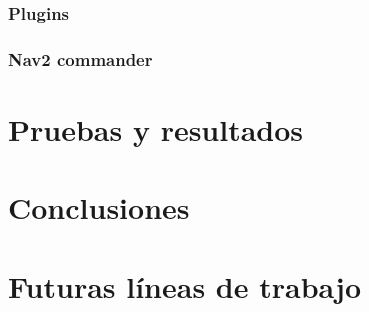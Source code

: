  \subsection{Plugins}

\subsection{Nav2 commander}

\cleardoublepage
\chapter{Pruebas y resultados}

\chapter{Conclusiones}

\chapter{Futuras líneas de trabajo}